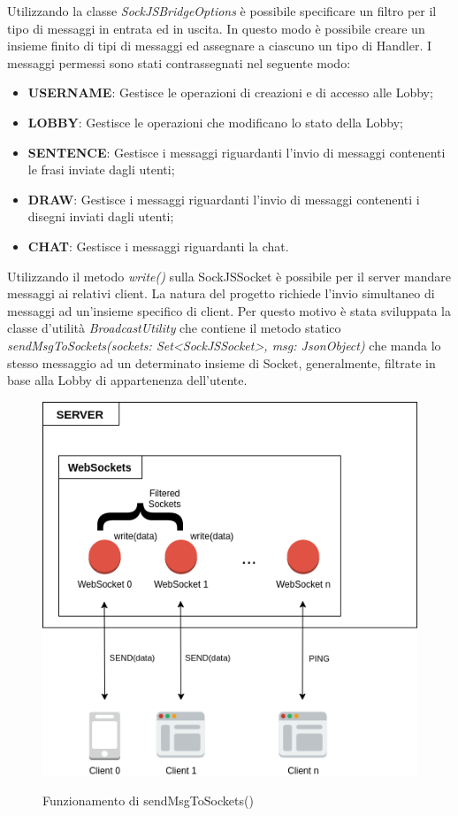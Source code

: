 Utilizzando la classe \textit{SockJSBridgeOptions} è possibile specificare un filtro per il tipo di messaggi in entrata ed in uscita. In questo modo è possibile creare un insieme finito di tipi di messaggi ed assegnare a ciascuno un tipo di Handler.
I messaggi permessi sono stati contrassegnati nel seguente modo:
\begin{itemize}
    \item \textbf{USERNAME}: Gestisce le operazioni di creazioni e di accesso alle Lobby;
    \item \textbf{LOBBY}: Gestisce le operazioni che modificano lo stato della Lobby;
    \item \textbf{SENTENCE}: Gestisce i messaggi riguardanti l'invio di messaggi contenenti le frasi inviate dagli utenti;
    \item \textbf{DRAW}: Gestisce i messaggi riguardanti l'invio di messaggi contenenti i disegni inviati dagli utenti;
    \item \textbf{CHAT}: Gestisce i messaggi riguardanti la chat.
\end{itemize}

\noindent Utilizzando il metodo \textit{write()} sulla SockJSSocket è possibile per il server mandare messaggi ai relativi client. La natura del progetto richiede l'invio simultaneo di messaggi ad un'insieme specifico di client.\newline
Per questo motivo è stata sviluppata la classe d'utilità \textit{BroadcastUtility} che contiene il metodo statico \textit{sendMsgToSockets(sockets: Set<SockJSSocket>, msg: JsonObject)} che manda lo stesso messaggio ad un determinato insieme di Socket, generalmente, filtrate in base alla Lobby di appartenenza dell'utente.

\begin{figure}[H]
    \caption{Funzionamento di sendMsgToSockets()}
    \centering
    \includegraphics[width=120mm]{img/general/broadcast.png}
    \label{fig:send_message}
\end{figure}

